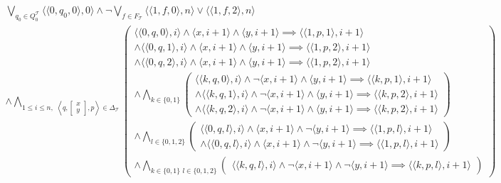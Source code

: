 \begin{multline}\label{qu:states}
    \bigvee_{q_0 \in Q_0^{\mathcal{T}}} \langle \langle 0, q_0, 0 \rangle , 0 \rangle \wedge \lnot \bigvee_{f \in F_{\mathcal{T}}} \langle \langle 1,f,0 \rangle,n \rangle \vee \langle \langle 1,f,2\rangle,n \rangle\\
    \wedge \bigwedge_{1 \leq i \leq n, \,\, \left\langle q, \left[\substack{x \\ y}\right],p \right\rangle \in \Delta_{\mathcal{T}}}
    \begin{pmatrix}
        \langle \langle 0,q,0 \rangle,i \rangle \wedge \langle x, i+1 \rangle \wedge \langle y, i+1 \rangle \implies \langle \langle 1,p,1 \rangle,i+1 \rangle \\
        \wedge \langle \langle 0,q,1 \rangle,i \rangle \wedge \langle x, i+1 \rangle \wedge \langle y, i+1 \rangle \implies \langle \langle 1,p,2 \rangle,i+1 \rangle \\
        \wedge \langle \langle 0,q,2 \rangle,i \rangle \wedge \langle x, i+1 \rangle \wedge \langle y, i+1 \rangle \implies \langle \langle 1,p,2 \rangle,i+1 \rangle \\
        \wedge \bigwedge_{k \in \{0,1\}}
        \begin{pmatrix}
            \langle \langle k,q,0 \rangle,i \rangle \wedge \lnot \langle x, i+1 \rangle \wedge \langle y, i+1 \rangle \implies \langle \langle k,p,1 \rangle,i+1 \rangle \\
        \wedge \langle \langle k,q,1 \rangle,i \rangle \wedge \lnot \langle x, i+1 \rangle \wedge \langle y, i+1 \rangle \implies \langle \langle k,p,2 \rangle,i+1 \rangle \\
        \wedge \langle \langle k,q,2 \rangle,i \rangle \wedge \lnot \langle x, i+1 \rangle \wedge \langle y, i+1 \rangle \implies \langle \langle k,p,2 \rangle,i+1 \rangle
        \end{pmatrix} \\
        \wedge \bigwedge_{l \in \{0,1,2\}}
        \begin{pmatrix}
            \langle \langle 0,q,l \rangle,i \rangle \wedge \langle x, i+1 \rangle \wedge \lnot \langle y, i+1 \rangle \implies \langle \langle 1,p,l \rangle,i+1 \rangle \\
        \wedge \langle \langle 0,q,l \rangle,i \rangle \wedge \langle x, i+1 \rangle \wedge \lnot \langle y, i+1 \rangle \implies \langle \langle 1,p,l \rangle,i+1 \rangle
        \end{pmatrix} \\
        \wedge \bigwedge_{k \in \{0,1\} \,\, l \in \{0,1,2\} }
        \begin{pmatrix}
            \langle \langle k,q,l \rangle,i \rangle \wedge \lnot \langle x, i+1 \rangle \wedge \lnot \langle y, i+1 \rangle \implies \langle \langle k,p,l \rangle,i+1 \rangle
        \end{pmatrix}
    \end{pmatrix}
\end{multline}

